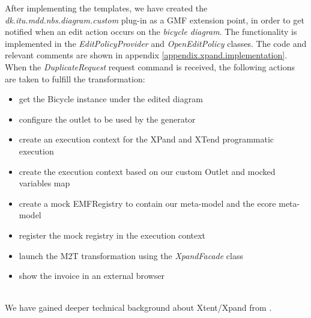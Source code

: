 \noindent After implementing the templates, we have created the
\emph{dk.itu.mdd.nbs.diagram.custom} plug-in as a GMF extension point, in order
to get notified when an edit action occurs on the \emph{bicycle diagram}. The
functionality is implemented in the \emph{EditPolicyProvider} and
\emph{OpenEditPolicy} classes. The code and relevant comments are shown in
appendix \ref{appendix.xpand.implementation}. When the \emph{DuplicateRequest} request command is received,
the following actions are taken to fulfill the transformation:
\begin{itemize}
  \item get the Bicycle instance under the edited diagram
  \item configure the outlet to be used by the generator
  \item create an execution context for the XPand and XTend programmatic
  execution
  \item create the execution context based on our custom Outlet and
  mocked variables map
  \item create a mock EMFRegistry to contain our meta-model and the
  ecore meta-model
  \item register the mock registry in the execution context
  \item launch the M2T transformation using the \emph{XpandFacade} class
  \item show the invoice in an external browser
\end{itemize}\\

\noindent We have gained deeper technical background about Xtent/Xpand from
\cite{XPAND_EXAMPLE}.
